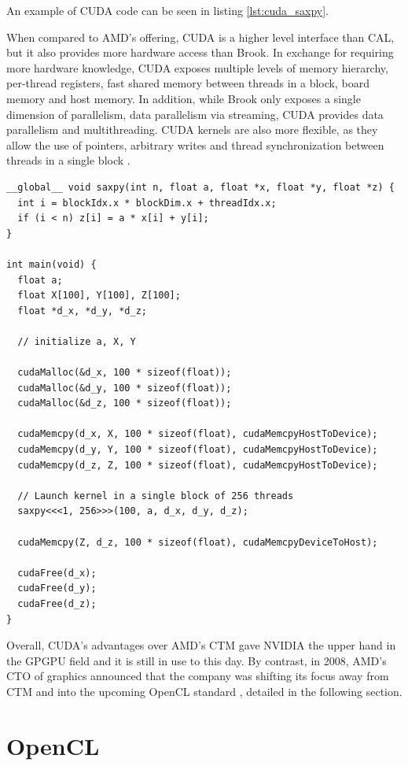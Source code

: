 An example of CUDA code can be seen in listing \ref{lst:cuda_saxpy}.

When compared to AMD's offering, CUDA is a higher level interface than CAL, but it also provides more hardware access than Brook. In exchange for requiring more hardware knowledge, CUDA exposes multiple levels of memory hierarchy, per-thread registers, fast shared memory between threads in a block, board memory and host memory. In addition, while Brook only exposes a single dimension of parallelism, data parallelism via streaming, CUDA provides data parallelism and multithreading. CUDA kernels are also more flexible, as they allow the use of pointers, arbitrary writes and thread synchronization between threads in a single block \cite{gpu_computing}.

\begin{lstlisting}[style=CStyle, caption=CUDA saxpy example, float, floatplacement=HT, label={lst:cuda_saxpy}]
__global__ void saxpy(int n, float a, float *x, float *y, float *z) {
  int i = blockIdx.x * blockDim.x + threadIdx.x;
  if (i < n) z[i] = a * x[i] + y[i];
}

int main(void) {
  float a;
  float X[100], Y[100], Z[100];
  float *d_x, *d_y, *d_z;

  // initialize a, X, Y

  cudaMalloc(&d_x, 100 * sizeof(float)); 
  cudaMalloc(&d_y, 100 * sizeof(float));
  cudaMalloc(&d_z, 100 * sizeof(float));

  cudaMemcpy(d_x, X, 100 * sizeof(float), cudaMemcpyHostToDevice);
  cudaMemcpy(d_y, Y, 100 * sizeof(float), cudaMemcpyHostToDevice);
  cudaMemcpy(d_z, Z, 100 * sizeof(float), cudaMemcpyHostToDevice);

  // Launch kernel in a single block of 256 threads
  saxpy<<<1, 256>>>(100, a, d_x, d_y, d_z);

  cudaMemcpy(Z, d_z, 100 * sizeof(float), cudaMemcpyDeviceToHost);

  cudaFree(d_x);
  cudaFree(d_y);
  cudaFree(d_z);
}
\end{lstlisting}

Overall, CUDA's advantages over AMD's CTM gave NVIDIA the upper hand in the GPGPU field and it is still in use to this day. By contrast, in 2008, AMD's CTO of graphics announced that the company was shifting its focus away from CTM and into the upcoming OpenCL standard \cite{amd_ctm_ditch}, detailed in the following section.

\section{OpenCL}

